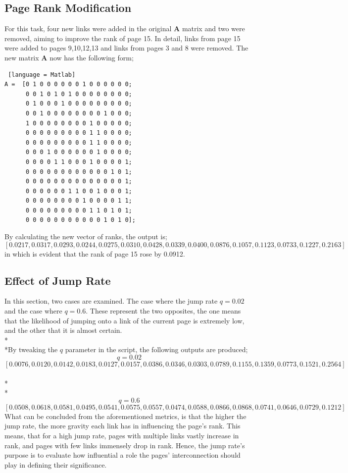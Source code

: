 \documentclass{article}
\begin{document}
\subsection{Page Rank Modification}
For this task, four new links were added in the original $\mathbf{A}$ matrix and two were removed, aiming to improve the rank of page 15. In detail, links from page 15 were added to pages 9,10,12,13 and links from pages 3 and 8 were removed. The new matrix $\mathbf{A}$ now has the following form;
\begin{lstlisting} [language = Matlab]
A =  [0 1 0 0 0 0 0 0 1 0 0 0 0 0 0;
      0 0 1 0 1 0 1 0 0 0 0 0 0 0 0; 
      0 1 0 0 0 1 0 0 0 0 0 0 0 0 0;  
      0 0 1 0 0 0 0 0 0 0 0 1 0 0 0;    
      1 0 0 0 0 0 0 0 0 1 0 0 0 0 0;    
      0 0 0 0 0 0 0 0 0 1 1 0 0 0 0;     
      0 0 0 0 0 0 0 0 0 1 1 0 0 0 0;     
      0 0 0 1 0 0 0 0 0 0 1 0 0 0 0;      
      0 0 0 0 1 1 0 0 0 1 0 0 0 0 1;     
      0 0 0 0 0 0 0 0 0 0 0 0 1 0 1;     
      0 0 0 0 0 0 0 0 0 0 0 0 0 0 1;      
      0 0 0 0 0 0 1 1 0 0 1 0 0 0 1;    
      0 0 0 0 0 0 0 0 1 0 0 0 0 1 1;    
      0 0 0 0 0 0 0 0 0 1 1 0 1 0 1;     
      0 0 0 0 0 0 0 0 0 0 0 1 0 1 0];
\end{lstlisting}
By calculating the new vector of ranks, the output is;
\[[0.0217,0.0317,0.0293,0.0244,0.0275,0.0310,0.0428,0.0339,0.0400,0.0876,0.1057,0.1123,0.0733,0.1227,0.2163]\]
in which is evident that the rank of page 15 rose by 0.0912.
\subsection{Effect of Jump Rate}
In this section, two cases are examined. The case where the jump rate $q = 0.02$ and the case where $q = 0.6$. These represent the two opposites, the one means that the likelihood of jumping onto a link of the current page is extremely low, and the other that it is almost certain.
\\*\\*By tweaking the $q$ parameter in the script, the following outputs are produced;
\[q = 0.02\]
\[[0.0076,0.0120,0.0142,0.0183,0.0127,0.0157,0.0386,0.0346,0.0303,0.0789,0.1155,0.1359,0.0773,0.1521,0.2564]\]
\\*\\*
\[q = 0.6\]
\[[0.0508,0.0618,0.0581,0.0495,0.0541,0.0575,0.0557,0.0474,0.0588,0.0866,0.0868,0.0741,0.0646,0.0729,0.1212]\]
What can be concluded from the aforementioned metrics, is that the higher the jump rate, the more gravity each link has in influencing the page's rank. This means, that for a high jump rate, pages with multiple links vastly increase in rank, and pages with few links immensely drop in rank. Hence, the jump rate's purpose is to evaluate how influential a role the pages' interconnection should play in defining their significance.
\pagebreak
\end{document}
